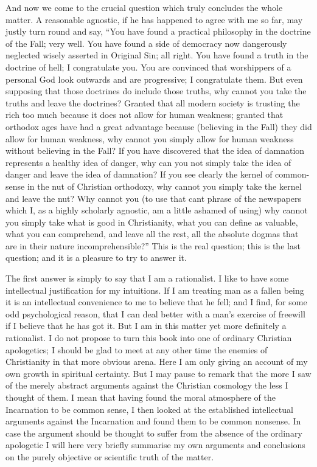And now we come to the crucial question which truly concludes the whole matter. A reasonable agnostic, if he has happened to agree with me so far, may justly turn round and say, “You have found a practical philosophy in the doctrine of the Fall; very well. You have found a side of democracy now dangerously neglected wisely asserted in Original Sin; all right. You have found a truth in the doctrine of hell; I congratulate you. You are convinced that worshippers of a personal God look outwards and are progressive; I congratulate them. But even supposing that those doctrines do include those truths, why cannot you take the truths and leave the doctrines? Granted that all modern society is trusting the rich too much because it does not allow for human weakness; granted that orthodox ages have had a great advantage because (believing in the Fall) they did allow for human weakness, why cannot you simply allow for human weakness without believing in the Fall? If you have discovered that the idea of damnation represents a healthy idea of danger, why can you not simply take the idea of danger and leave the idea of damnation? If you see clearly the kernel of common-sense in the nut of Christian orthodoxy, why cannot you simply take the kernel and leave the nut? Why cannot you (to use that cant phrase of the newspapers which I, as a highly scholarly agnostic, am a little ashamed of using) why cannot you simply take what is good in Christianity, what you can define as valuable, what you can comprehend, and leave all the rest, all the absolute dogmas that are in their nature incomprehensible?” This is the real question; this is the last question; and it is a pleasure to try to answer it.

The first answer is simply to say that I am a rationalist. I like to have some intellectual justification for my intuitions. If I am treating man as a fallen being it is an intellectual convenience to me to believe that he fell; and I find, for some odd psychological reason, that I can deal better with a man’s exercise of freewill if I believe that he has got it. But I am in this matter yet more definitely a rationalist. I do not propose to turn this book into one of ordinary Christian apologetics; I should be glad to meet at any other time the enemies of Christianity in that more obvious arena. Here I am only giving an account of my own growth in spiritual certainty. But I may pause to remark that the more I saw of the merely abstract arguments against the Christian cosmology the less I thought of them. I mean that having found the moral atmosphere of the Incarnation to be common sense, I then looked at the established intellectual arguments against the Incarnation and found them to be common nonsense. In case the argument should be thought to suffer from the absence of the ordinary apologetic I will here very briefly summarise my own arguments and conclusions on the purely objective or scientific truth of the matter.

